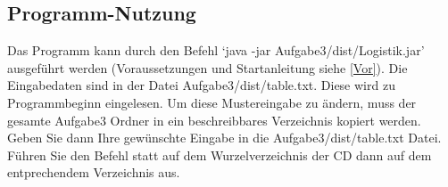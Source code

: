 \subsection{Programm-Nutzung}
Das Programm kann durch den Befehl `java -jar Aufgabe3/dist/Logistik.jar' ausgeführt werden (Voraussetzungen und Startanleitung siehe \ref{Vor}).
Die Eingabedaten sind in der Datei Aufgabe3/dist/table.txt. Diese wird zu Programmbeginn eingelesen.
Um diese Mustereingabe zu ändern, muss der gesamte Aufgabe3 Ordner in ein beschreibbares Verzeichnis kopiert werden. Geben Sie dann Ihre gewünschte
Eingabe in die Aufgabe3/dist/table.txt Datei. Führen Sie den Befehl statt auf dem Wurzelverzeichnis der CD dann auf dem entprechendem Verzeichnis aus.
 